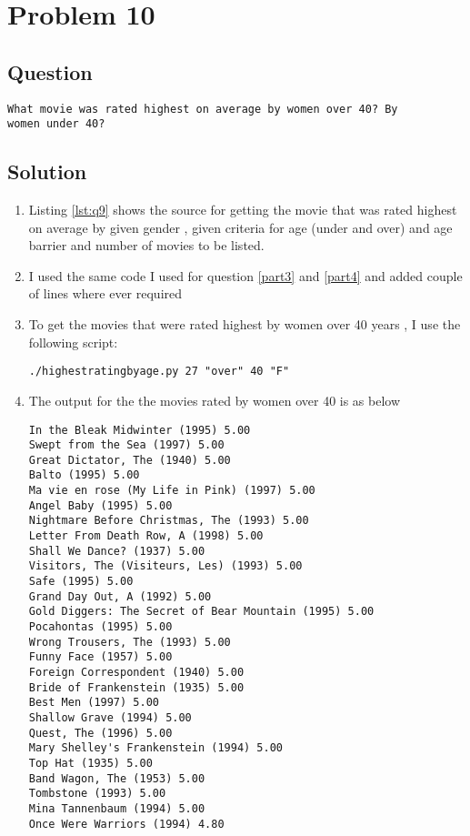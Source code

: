 \section{Problem 10}
\label{part10}
\subsection*{Question}
\begingroup
\begin{verbatim}
What movie was rated highest on average by women over 40? By
women under 40?
\end{verbatim}
\subsection{Solution}
\begin{enumerate}
\item Listing \ref{lst:q9} shows the source for getting the movie that was rated highest on average by given gender , given criteria for age (under and over) and age barrier and number of movies to be listed.
\item I used the same code I used for question \ref{part3} and \ref{part4} and added couple of lines where ever required 
\item To get the movies that were rated highest by women over 40 years , I use the following script:
\begin{lstlisting}[frame=single]
./highestratingbyage.py 27 "over" 40 "F"

\end{lstlisting}
\item The output for the the movies rated by women over 40 is as below
\begin{lstlisting}[frame=single]
In the Bleak Midwinter (1995) 5.00
Swept from the Sea (1997) 5.00
Great Dictator, The (1940) 5.00
Balto (1995) 5.00
Ma vie en rose (My Life in Pink) (1997) 5.00
Angel Baby (1995) 5.00
Nightmare Before Christmas, The (1993) 5.00
Letter From Death Row, A (1998) 5.00
Shall We Dance? (1937) 5.00
Visitors, The (Visiteurs, Les) (1993) 5.00
Safe (1995) 5.00
Grand Day Out, A (1992) 5.00
Gold Diggers: The Secret of Bear Mountain (1995) 5.00
Pocahontas (1995) 5.00
Wrong Trousers, The (1993) 5.00
Funny Face (1957) 5.00
Foreign Correspondent (1940) 5.00
Bride of Frankenstein (1935) 5.00
Best Men (1997) 5.00
Shallow Grave (1994) 5.00
Quest, The (1996) 5.00
Mary Shelley's Frankenstein (1994) 5.00
Top Hat (1935) 5.00
Band Wagon, The (1953) 5.00
Tombstone (1993) 5.00
Mina Tannenbaum (1994) 5.00
Once Were Warriors (1994) 4.80


\end{lstlisting}
\end{enumerate}
